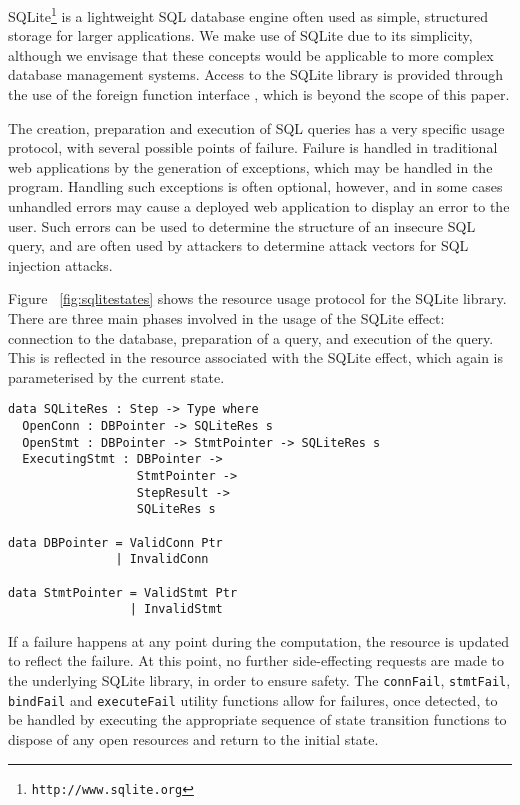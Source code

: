 \documentclass[preprint]{sigplanconf}
\begin{document}
SQLite\footnote{\texttt{http://www.sqlite.org}} is a lightweight SQL database engine often used as simple, structured storage for larger applications. We make use of SQLite due to its simplicity, although we envisage that these concepts would be applicable to more complex database management systems. Access to the SQLite library is provided through the use of the \idris{} foreign function interface \cite{brady2011idris}, which is beyond the scope of this paper.

The creation, preparation and execution of SQL queries has a very specific usage protocol, with several possible points of failure. Failure is handled in traditional web applications by the generation of exceptions, which may be handled in the program.
Handling such exceptions is often optional, however, and in some cases unhandled errors may cause a deployed web application to display an error to the user. Such errors can be used to determine the structure of an insecure SQL query, and are often used by attackers to determine attack vectors for SQL injection attacks.

Figure ~\ref{fig:sqlitestates} shows the resource usage protocol for the SQLite library. There are three main phases involved in the usage of the SQLite effect: connection to the database, preparation of a query, and execution of the query. This is reflected in the resource associated with the SQLite effect, which again is parameterised by the current state.
{\small
\begin{verbatim}
data SQLiteRes : Step -> Type where
  OpenConn : DBPointer -> SQLiteRes s
  OpenStmt : DBPointer -> StmtPointer -> SQLiteRes s
  ExecutingStmt : DBPointer -> 
                  StmtPointer -> 
                  StepResult -> 
                  SQLiteRes s
                  
data DBPointer = ValidConn Ptr
               | InvalidConn

data StmtPointer = ValidStmt Ptr
                 | InvalidStmt 
\end{verbatim}
}
If a failure happens at any point during the computation, the resource is updated to reflect the failure. At this point, no further side-effecting requests are made to the underlying SQLite library, in order to ensure safety. The \texttt{connFail}, \texttt{stmtFail}, \texttt{bindFail} and \texttt{executeFail} utility functions allow for failures, once detected, to be handled by executing the appropriate sequence of state transition functions to dispose of any open resources and return to the initial state. 
\end{document}
